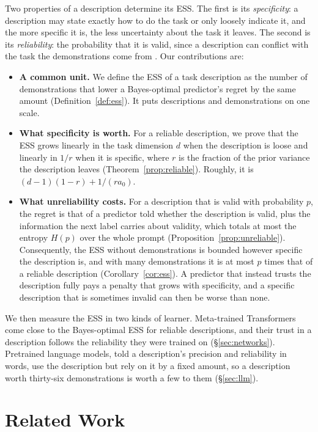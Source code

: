\documentclass{article}
\begin{document}
Two properties of a description determine its ESS. The first is its \emph{specificity}: a description may state exactly how to do the task or only loosely indicate it, and the more specific it is, the less uncertainty about the task it leaves. The second is its \emph{reliability}: the probability that it is valid, since a description can conflict with the task the demonstrations come from \citep{evans2006}. Our contributions are:
\begin{itemize}
    \item \textbf{A common unit.} We define the ESS of a task description as the number of demonstrations that lower a Bayes-optimal predictor's regret by the same amount (Definition~\ref{def:ess}). It puts descriptions and demonstrations on one scale.
    \item \textbf{What specificity is worth.} For a reliable description, we prove that the ESS grows linearly in the task dimension $d$ when the description is loose and linearly in $1/r$ when it is specific, where $r$ is the fraction of the prior variance the description leaves (Theorem~\ref{prop:reliable}). Roughly, it is $(d-1)(1-r) + 1/(r a_0)$.
    \item \textbf{What unreliability costs.} For a description that is valid with probability $p$, the regret is that of a predictor told whether the description is valid, plus the information the next label carries about validity, which totals at most the entropy $H(p)$ over the whole prompt (Proposition~\ref{prop:unreliable}). Consequently, the ESS without demonstrations is bounded however specific the description is, and with many demonstrations it is at most $p$ times that of a reliable description (Corollary~\ref{cor:ess}). A predictor that instead trusts the description fully pays a penalty that grows with specificity, and a specific description that is sometimes invalid can then be worse than none.
\end{itemize}
We then measure the ESS in two kinds of learner. Meta-trained Transformers come close to the Bayes-optimal ESS for reliable descriptions, and their trust in a description follows the reliability they were trained on (\S\ref{sec:networks}). Pretrained language models, told a description's precision and reliability in words, use the description but rely on it by a fixed amount, so a description worth thirty-six demonstrations is worth a few to them (\S\ref{sec:llm}).

\section{Related Work}
\end{document}
